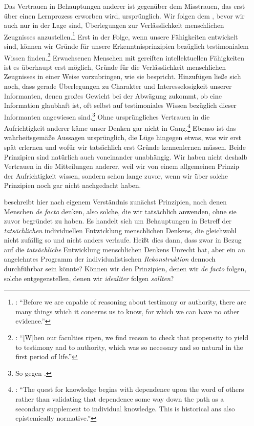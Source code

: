 Das Vertrauen in Behauptungen anderer ist gegenüber dem Misstrauen, das erst
über einen Lernprozess erworben wird, ursprünglich. Wir folgen dem , bevor wir auch nur in der Lage sind, Überlegungen zur
Verlässlichkeit menschlichen Zeugnisses
anzustellen.\footnote{\cite[Vgl.][487]{Reid:EssaysontheIntellectualPowersofMan2002}:
\enquote{Before we are capable of reasoning about testimony or authority, there
are many things which it concerns us to know, for which we can have no other
evidence.}} Erst in der Folge, wenn unsere Fähigkeiten entwickelt sind, können
wir Gründe für unsere Erkenntnisprinzipien bezüglich testimonialem Wissen
finden.\footnote{\cite[Vgl.][488]{Reid:EssaysontheIntellectualPowersofMan2002}:
\enquote{[W]hen our faculties ripen, we find reason to check that propensity to
yield to testimony and to authority, which was so necessary and so natural in
the first period of life.}} Erwachsenen Menschen mit gereiften intellektuellen
Fähigkeiten ist es überhaupt erst möglich, Gründe für die Verlässlichkeit
menschlichen Zeugnisses in einer Weise vorzubringen, wie sie 
bespricht. Hinzufügen ließe sich noch, dass gerade Überlegungen zu Charakter und
Interesselosigkeit unserer Informanten, denen großes Gewicht bei der Abwägung
zukommt, ob eine Information glaubhaft ist, oft selbst auf testimoniales Wissen
bezüglich dieser Informanten angewiesen sind.\footnote{So
\textcite[vgl.][196]{Coady:ReidandtheSocialOperationsofMind2004} gegen
.} Ohne ursprüngliches Vertrauen in die Aufrichtigkeit
anderer käme unser Denken gar nicht in
Gang.\footnote{\cite[Vgl.][193]{Coady:ReidandtheSocialOperationsofMind2004}:
\enquote{The quest for knowledge begins with dependence upon the word of others
rather than validating that dependence some way down the path as a secondary
supplement to individual knowledge. This  is historical
ans also epistemically normative.}} Ebenso ist das wahrheitsgemäße Aussagen ursprünglich,
die Lüge hingegen etwas, was wir erst spät erlernen und wofür wir tatsächlich
erst Gründe kennenlernen müssen. Beide Prinzipien sind natürlich auch
voneinander unabhängig. Wir haben nicht deshalb Vertrauen in die Mitteilungen
anderer, weil wir von einem allgemeinen Prinzip der Aufrichtigkeit wissen,
sondern schon lange zuvor, wenn wir über solche Prinzipien noch gar nicht
nachgedacht haben.

 beschreibt hier nach eigenem Verständnis zunächst Prinzipien, nach
denen Menschen \emph{de facto} denken, also solche, die wir tatsächlich
anwenden, ohne sie zuvor begründet zu haben. Es handelt sich um Behauptungen in
Betreff der \emph{tatsächlichen} individuellen Entwicklung menschlichen Denkens, die
gleichwohl nicht zufällig so und nicht anders verlaufe. Heißt dies dann, dass
 zwar in Bezug auf die \emph{tatsächliche} Entwicklung menschlichen
Denkens Unrecht hat, aber ein an  angelehntes Programm der
individualistischen \emph{Rekonstruktion} dennoch durchführbar sein könnte?
Können wir den Prinzipien, denen wir \emph{de facto} folgen, solche
entgegenstellen, denen wir \emph{idealiter} folgen \emph{sollten}?

